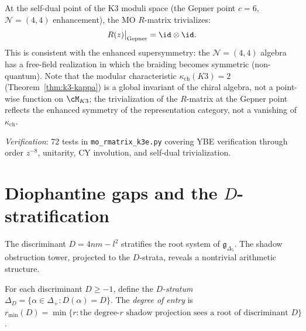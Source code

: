 \begin{conjecture}
\label{conj:k3e-self-dual-limit}
\ClaimStatusConjectured
At the self-dual point of the K3 moduli space (the Gepner point $c = 6$, $\mathcal{N} = (4,4)$ enhancement), the MO $R$-matrix trivializes:
\[
 R(z)\big|_{\mathrm{Gepner}} = \id \otimes \id.
\]
This is consistent with the enhanced supersymmetry: the $\mathcal{N} = (4,4)$ algebra has a free-field realization in which the braiding becomes symmetric (non-quantum). Note that the modular characteristic $\kappa_{\mathrm{ch}}(K3) = 2$ (Theorem~\ref{thm:k3-kappa}) is a global invariant of the chiral algebra, not a point-wise function on $\cM_{K3}$; the trivialization of the $R$-matrix at the Gepner point reflects the enhanced symmetry of the representation category, not a vanishing of $\kappa_{\mathrm{ch}}$.
\end{conjecture}

\noindent\textit{Verification}: 72 tests in \texttt{mo\_rmatrix\_k3e.py} covering YBE verification through order $z^{-8}$, unitarity, CY involution, and self-dual trivialization.

\section{Diophantine gaps and the $D$-stratification}
\label{sec:k3e-diophantine}

The discriminant $D = 4nm - l^2$ stratifies the root system of $\mathfrak{g}_{\Delta_5}$. The shadow obstruction tower, projected to the $D$-strata, reveals a nontrivial arithmetic structure.

\begin{definition}[$D$-stratification]
\label{def:k3e-d-stratification}
For each discriminant $D \geq -1$, define the \emph{$D$-stratum} $\Delta_D = \{\alpha \in \Delta_+ : D(\alpha) = D\}$. The \emph{degree of entry} is $r_{\min}(D) = \min\{r : \text{the degree-}r\text{ shadow projection sees a root of discriminant } D\}$.
\end{definition}

